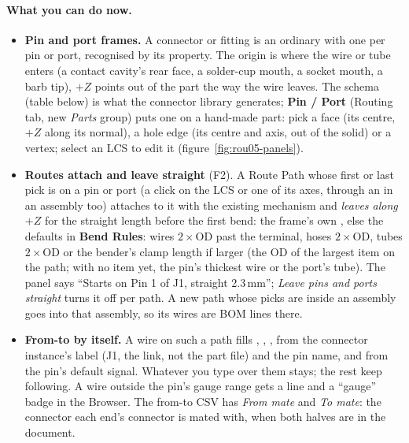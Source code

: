 \paragraph{What you can do now.}
\begin{itemize}[nosep]
  \item \textbf{Pin and port frames.} A connector or fitting is an ordinary  with one
         per pin or port, recognised by its  property. The origin is
        where the wire or tube enters (a contact cavity's rear face, a solder-cup mouth, a socket mouth, a barb tip),
        $+Z$ points out of the part the way the wire leaves. The schema (table below) is what the connector library
        generates; \textbf{Pin / Port} (Routing tab, new \emph{Parts} group) puts one on a hand-made part: pick a
        face (its centre, $+Z$ along its normal), a hole edge (its centre and axis, out of the solid) or a vertex;
        select an LCS to edit it (figure~\ref{fig:rou05-panels}).
  \item \textbf{Routes attach and leave straight} (F2). A Route Path whose first or last pick is on a pin or port
        (a click on the LCS or one of its axes, through an  in an assembly too) attaches to it with
        the existing mechanism and \emph{leaves along $+Z$} for the straight length before the first bend: the
        frame's own , else the defaults in \textbf{Bend Rules}: wires $2\times$OD past the
        terminal, hoses $2\times$OD, tubes $2\times$OD or the bender's clamp length if larger (the OD of the
        largest item on the path; with no item yet, the pin's thickest wire or the port's tube). The panel says
        ``Starts on Pin 1 of J1, straight 2.3\,mm''; \emph{Leave pins and ports straight} turns it off per path.
        A new path whose picks are inside an assembly goes into that assembly, so its wires are BOM lines there.
  \item \textbf{From-to by itself.} A wire on such a path fills , , ,
         from the connector instance's label (J1, the link, not the part file) and the pin name, and
         from the pin's default signal. Whatever you type over them stays; the rest keep following.
        A wire outside the pin's gauge range gets a  line and a ``gauge'' badge in the Browser.
        The from-to CSV has \emph{From mate} and \emph{To mate}: the connector each end's connector is mated
        with, when both halves are in the document.

\end{itemize}
